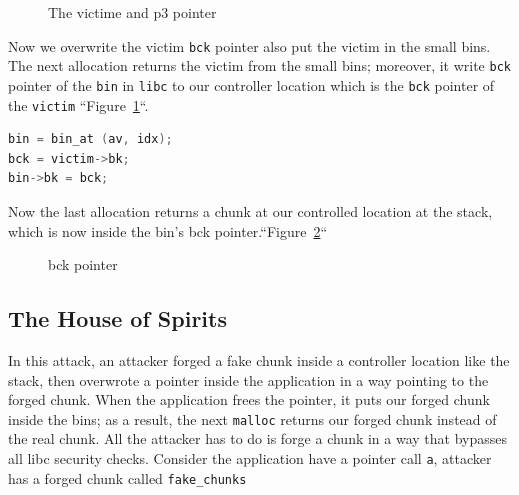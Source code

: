\documentclass{masterthesis}
\newcommand*\sbs{small bins}
\newcommand*\mallocc{\lstinline{malloc}\xspace}
\begin{document}
\begin{figure}[h!]
\caption{The victime and p3 pointer}
\label{fig:gdb4}
\end{figure}

Now we overwrite the victim \lstinline{bck} pointer also put the victim in the \sbs{}. The next allocation returns the victim from the \sbs{}; moreover, it write \lstinline{bck} pointer of the \lstinline{bin} in \lstinline{libc} to our controller location which is the \lstinline{bck} pointer of the \lstinline{victim} ``Figure~\ref{fig:gdb4}``.

\begin{lstlisting}[language=c,frame=tlrb]
bin = bin_at (av, idx);
bck = victim->bk;
bin->bk = bck;
\end{lstlisting}

Now the last allocation returns a chunk at our controlled location at the stack, which is now inside the bin's bck pointer.``Figure~\ref{fig:gdb5}``

\begin{figure}[h!]
\caption{bck pointer}
\label{fig:gdb5}
\end{figure}

\subsection{The House of Spirits}
In this attack, an attacker forged a fake chunk inside a controller location like the stack, then overwrote a pointer inside the application in a way pointing to the forged chunk. When the application frees the pointer, it puts our forged chunk inside the bins; as a result, the next \mallocc{} returns our forged chunk instead of the real chunk. All the attacker has to do is forge a chunk in a way that bypasses all libc security checks. Consider the application have a pointer call \lstinline{a}, attacker has a forged chunk called \lstinline{fake_chunks}
\end{document}
